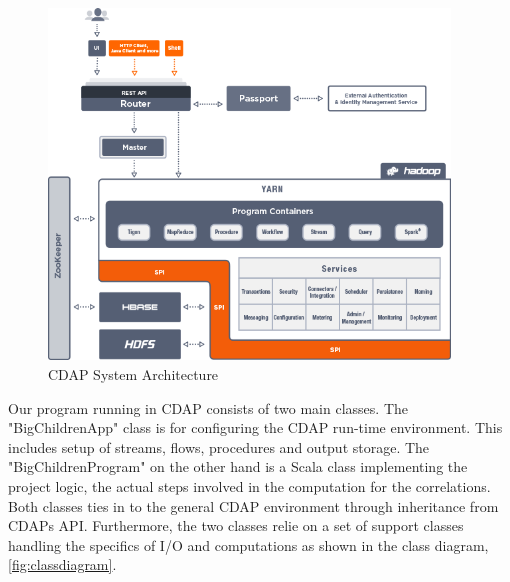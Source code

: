 \documentclass[
10pt, %
a4paper, %
oneside, %
headinclude,footinclude, %
useAMS,
usenatbib
]{template/mn2e}  %
\begin{document}
\begin{figure}
  \centering
  \includegraphics[width=0.95\textwidth]{src/Diag_Architecture}
  \caption{CDAP System Architecture}
  \label{fig:cdapsystem}
\end{figure}

Our program running in CDAP consists of two main classes. The "BigChildrenApp" class is for configuring the CDAP run-time environment. This includes setup of streams, flows, procedures and output storage. The "BigChildrenProgram" on the other hand is a Scala class implementing the project logic, the actual steps involved in the computation for the correlations. Both classes ties in to the general CDAP environment through inheritance from CDAPs API. Furthermore, the two classes relie on a set of support classes handling the specifics of I/O and computations as shown in the class diagram, \ref{fig:classdiagram}.
\end{document}
